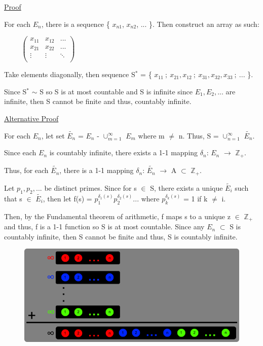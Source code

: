 { \color{magenta} \underline{Proof} } 
	
	For each $E_n$, there is a sequence \{ $x_{n1}$, $x_{n2}$, ... \}.
	Then construct an array as such:

	{\small $ \hspace{1cm}
	\left(
	\begin{array}{ccc}
		x_{11} & x_{12} & ... \\
		x_{21} & x_{22} & ... \\
		\vdots & \vdots & \ddots \\
	\end{array}
	\right)
	$}
		
	Take elements diagonally, then sequence S$^*$ =
	\{ $x_{11} \ ; \ x_{21}, x_{12} \ ; \ x_{31}, x_{32}, x_{33} \ ; \ ... $ \}.
		
	\begin{adjustbox}{minipage=15cm, right, vspace=0.1cm 0cm}
		Since S$^*$ $\sim$ S so S is at most countable and S is infinite since
		$E_1, E_2, ...$ are infinite, then S cannot be finite and thus, countably infinite.
	\end{adjustbox}

{ \color{magenta} \underline{Alternative Proof} } 

	For each $E_n$, let set $\widetilde{E_n}$ = $E_n$ - $\cup_{m=1}^{\infty}$ $E_m$ where
	m $\neq$ n. Thus, S = $\cup_{n=1}^{\infty}$ $\widetilde{E_n}$.

	Since each $E_n$ is countably infinite, there exists a 1-1 mapping
	$\delta_n$: $E_n$ $\rightarrow$ $\mathbb{Z}_+$.

	Thus, for each $\widetilde{E_n}$, there is a 1-1 mapping
	$\delta_n$: $\widetilde{E_n}$ $\rightarrow$ A $\subset$ $\mathbb{Z}_+$.

	Let $p_1, p_2, ... $ be distinct primes.
	Since for s $\in$ S, there exists a unique $\widetilde{E_i}$ such that
	s $\in$ $\widetilde{E_i}$, then let f(s) = $p_1^{\delta_1(s)} p_2^{\delta_2(s)}...$
	where $p_k^{\delta_k(s)}$ = 1 if k $\neq$ i.

	Then, by the Fundamental theorem of arithmetic, f maps s to a unique z $\in$ $\mathbb{Z}_+$
	and thus, f is a 1-1 function so S is at most countable.
	Since any $E_n$ $\subset$ S is countably infinite, then S cannot be finite
	and thus, S is countably infinite.

\begin{figure}[h]
	\centering
	\includegraphics[scale=0.38]{Images/6.2.2.png}
\end{figure}

